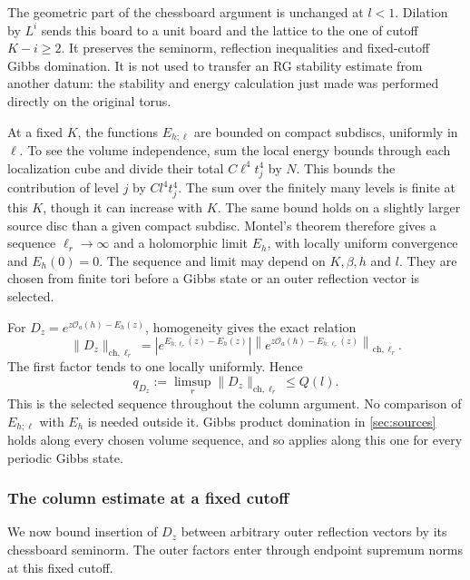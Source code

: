 \documentclass[11pt,letterpaper,reqno]{amsart}
\theoremstyle{definition}
\theoremstyle{remark}
\newcommand{\cO}{\mathcal O}
\begin{document}
The geometric part of the chessboard argument is unchanged at
$l<1$. Dilation by $L^i$ sends this board to a unit board and
the lattice to the one of cutoff $K-i\ge2$. It preserves the
seminorm, reflection inequalities and fixed-cutoff Gibbs domination.
It is not used to transfer an RG stability estimate from another
datum: the stability and energy calculation just made was performed
directly on the original torus.

At a fixed $K$, the functions $E_{h;\ell}$ are bounded on compact
subdiscs, uniformly in $\ell$. To see the volume independence,
sum the local energy bounds through each localization cube and
divide their total $C\ell^4t_j^4$ by $N$. This bounds the
contribution of level $j$ by $Cl^4t_j^4$. The sum over the
finitely many levels is finite at this $K$, though it can increase
with $K$. The same bound holds on a slightly larger source disc
than a given compact subdisc. Montel's theorem therefore gives a
sequence $\ell_r\to\infty$ and a holomorphic limit $E_h$, with
locally uniform convergence and $E_h(0)=0$. The sequence and limit
may depend on $K,\beta,h$ and $l$. They are chosen from finite
tori before a Gibbs state or an outer reflection vector is selected.

For $D_z=e^{z\cO_a(h)-E_h(z)}$, homogeneity gives the exact
relation
\[
 \|D_z\|_{\mathrm{ch},\ell_r}
  =|e^{E_{h;\ell_r}(z)-E_h(z)}|
       \left\|e^{z\cO_a(h)-E_{h;\ell_r}(z)}
                                      \right\|_{\mathrm{ch},\ell_r}.
\]
The first factor tends to one locally uniformly. Hence
\begin{equation}\label{eq:insertion-selected-normalizer}
 q_{D_z}:=\limsup_r\|D_z\|_{\mathrm{ch},\ell_r}\le Q(l).
\end{equation}
This is the selected sequence throughout the column argument. No
comparison of $E_{h;\ell}$ with $E_h$ is needed outside it.
Gibbs product domination in \cref{sec:sources} holds along every
chosen volume sequence, and so applies along this one for every
periodic Gibbs state.

\subsubsection{The column estimate at a fixed cutoff}

We now bound insertion of $D_z$ between arbitrary outer reflection
vectors by its chessboard seminorm. The outer factors enter through
endpoint supremum norms at this fixed cutoff.
\end{document}
